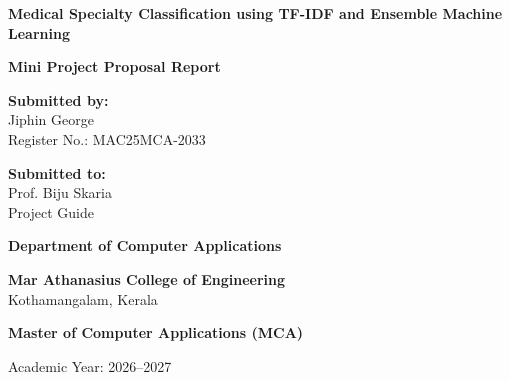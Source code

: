 \documentclass[12pt,a4paper]{report}
\begin{document}
\begin{titlepage}
    \begin{center}
        \vspace*{1cm}
        
        \Huge
        \textbf{Medical Specialty Classification using TF-IDF and Ensemble Machine Learning}
        
        \vspace{1.5cm}
        
        \Large
        \textbf{Mini Project Proposal Report}
        
        \vspace{2.5cm}
        
        \large
        \textbf{Submitted by:} \\
        Jiphin George \\
        Register No.: MAC25MCA-2033
        
        \vspace{1.5cm}
        
        \textbf{Submitted to:} \\
        Prof. Biju Skaria \\
        Project Guide
    \end{center}
    
    \vfill
    
    \begin{center}
        \Large
        \textbf{Department of Computer Applications}
        
        \vspace{0.5cm}
        
        \textbf{Mar Athanasius College of Engineering} \\
        Kothamangalam, Kerala
        
        \vspace{0.5cm}
        
        \large
        \textbf{Master of Computer Applications (MCA)}
        
        \vspace{0.5cm}
        
        Academic Year: 2026--2027
        \vspace*{1cm}
    \end{center}
\end{titlepage}


\par

\par

\par

\par

\end{document}
